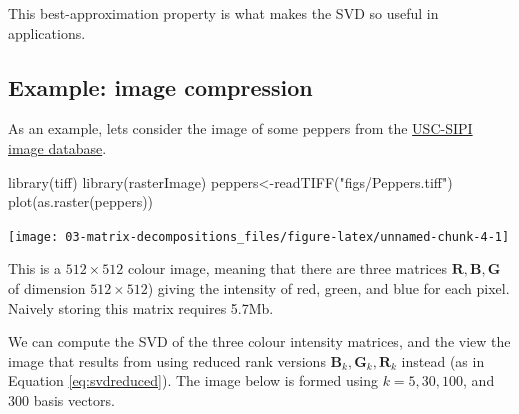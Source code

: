 \documentclass[
]{book}
\newenvironment{Shaded}{\begin{snugshade}}{\end{snugshade}}
\newcommand{\FunctionTok}[1]{\textcolor[rgb]{0.00,0.00,0.00}{#1}}
\newcommand{\NormalTok}[1]{#1}
\newcommand{\OtherTok}[1]{\textcolor[rgb]{0.56,0.35,0.01}{#1}}
\newcommand{\StringTok}[1]{\textcolor[rgb]{0.31,0.60,0.02}{#1}}
\theoremstyle{definition}
\theoremstyle{definition}
\theoremstyle{definition}
\theoremstyle{definition}
\theoremstyle{remark}
\begin{document}
This best-approximation property is what makes the SVD so useful in applications.

\hypertarget{example-image-compression}{%
\subsection{Example: image compression}\label{example-image-compression}}

As an example, lets consider the image of some peppers from the \href{http://sipi.usc.edu/database/}{USC-SIPI image database}.

\begin{Shaded}
\begin{Highlighting}[]
\FunctionTok{library}\NormalTok{(tiff)}
\FunctionTok{library}\NormalTok{(rasterImage)}
\NormalTok{peppers}\OtherTok{\textless{}{-}}\FunctionTok{readTIFF}\NormalTok{(}\StringTok{"figs/Peppers.tiff"}\NormalTok{)}
\FunctionTok{plot}\NormalTok{(}\FunctionTok{as.raster}\NormalTok{(peppers))}
\end{Highlighting}
\end{Shaded}

\texttt{[image: 03-matrix-decompositions\_files/figure-latex/unnamed-chunk-4-1]}

This is a \(512 \times 512\) colour image, meaning that there are three matrices \(\mathbf R, \mathbf B,\mathbf G\) of dimension \(512\times 512\)) giving the intensity of red, green, and blue for each pixel.
Naively storing this matrix requires 5.7Mb.

We can compute the SVD of the three colour intensity matrices, and the view the image that results from using reduced rank versions \(\mathbf B_k, \mathbf G_k, \mathbf R_k\) instead (as in Equation \eqref{eq:svdreduced}). The image below is formed using \(k=5, 30, 100\), and \(300\) basis vectors.
\end{document}
